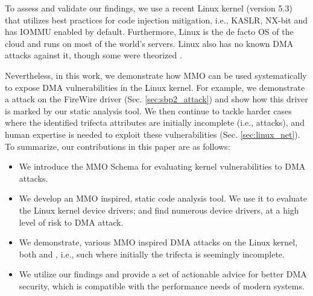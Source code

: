 To assess and validate our findings, we use a recent Linux kernel (version 5.3) that utilizes best practices for code injection mitigation, i.e., KASLR, NX-bit and has IOMMU enabled by default. Furthermore, Linux is the de facto OS of the cloud and runs on most of the world's servers. Linux also has no known DMA attacks against it, though some were theorized \cite{MMT16,thunder}. 

Nevertheless, in this work, we demonstrate how MMO can be used systematically to expose DMA vulnerabilities in the Linux kernel. For example, we demonstrate a \simple{} attack on the FireWire \spb{} driver (Sec. \ref{sec:sbp2_attack}) and show how this driver is marked by our static analysis tool. 
We then continue to tackle harder cases where the identified trifecta attributes are initially incomplete (i.e., \compound{} attacks), and human expertise is needed to exploit these vulnerabilities (Sec. \ref{sec:linux_net}). To summarize, our contributions in this paper are as follows:
\begin{itemize}
    \item We introduce the MMO Schema for evaluating kernel vulnerabilities to DMA attacks. 
    \item We develop an MMO inspired, static code analysis tool. We use it to evaluate the Linux kernel device drivers; and find numerous device drivers, at a high level of risk to DMA attack.
    \item We demonstrate, various MMO inspired DMA attacks on the Linux kernel, both \simple{} and \compound{}, i.e., such where initially the trifecta is seemingly incomplete. 
    \item We utilize our findings and provide a set of actionable advice for better DMA security, which is compatible with the performance needs of modern systems.
\end{itemize}